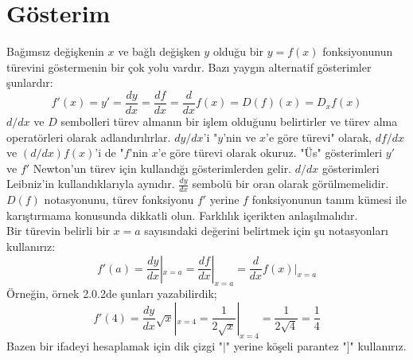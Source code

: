 \section{\protect Gösterim}\label{bolumetiketi}
Bağımsız değişkenin $x$ ve bağlı değişken $y$ olduğu bir $y=f(x)$ fonksiyonunun türevini göstermenin bir çok yolu vardır. Bazı yaygın alternatif gösterimler şunlardır:
\begin{equation*}
f'(x)= y' = \frac{dy}{dx}=\frac{df}{dx} = \frac{d}{dx}f(x) = D(f)(x) =D_x f(x)
\end{equation*}
$d/dx$ ve $D$ sembolleri türev almanın bir işlem olduğunu belirtirler ve türev alma operatörleri olarak adlandırılırlar. $dy/dx$'i "$y$'nin ve $x$'e göre türevi" olarak, $df/dx$ ve $(d/dx)f(x)$'i de "$f$'nin $x$'e göre türevi olarak okuruz. "Üs" gösterimleri $y'$ ve $f'$ Newton'un türev için kullandığı gösterimlerden gelir. $d/dx$ gösterimleri Leibniz'in kullandıklarıyla aynıdır. $\displaystyle \frac{dy}{dx}$ sembolü bir oran olarak görülmemelidir. \\
$D(f)$ notasyonunu, türev fonksiyonu $f'$ yerine $f$ fonksiyonunun tanım kümesi ile karıştırmama konusunda dikkatli olun. Farklılık içerikten anlaşılmalıdır.\\
Bir türevin belirli bir $x=a$ sayısındaki değerini belirtmek için şu notasyonları kullanırız:
\begin{equation*}
f'(a) = \frac{dy}{dx} |_{x=a} = \frac{df}{dx} |_{x=a} = \frac{d}{dx}f(x) |_{x=a}
\end{equation*}
Örneğin, örnek 2.0.2de şunları yazabilirdik;
\begin{equation*}
f'(4) = \frac{dy}{dx}\sqrt{x} |_{x=4} = \frac{1}{2\sqrt{x}} |_{x=4} = \frac{1}{2\sqrt{4}}=\frac{1}{4}
\end{equation*}
Bazen bir ifadeyi hesaplamak için dik çizgi "$|$" yerine köşeli parantez "$]$" kullanırız. \\
